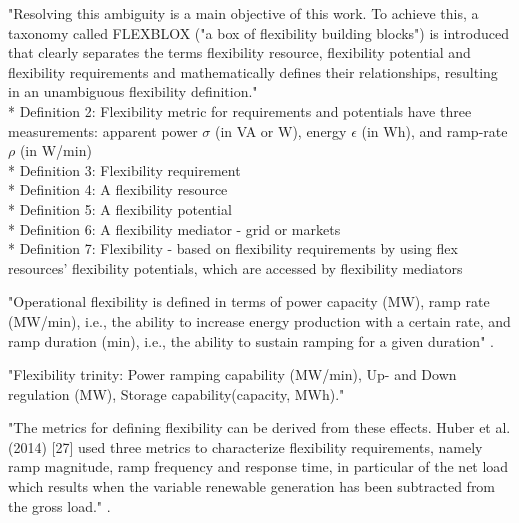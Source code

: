 "Resolving this ambiguity is a main objective of this work. To achieve this, a taxonomy called FLEXBLOX ("a box of flexibility building blocks") is introduced that clearly separates the terms flexibility resource, flexibility potential and flexibility requirements and mathematically defines their relationships, resulting in an unambiguous flexibility definition." \cite{lechl_review_2023} \\
* Definition 2: Flexibility metric for requirements and potentials have three measurements: apparent power $\sigma$ (in VA or W), energy $\epsilon$ (in Wh), and ramp-rate $\rho$ (in W/min) \\
* Definition 3: Flexibility requirement \\
* Definition 4: A flexibility resource \\
* Definition 5: A flexibility potential \\
* Definition 6: A flexibility mediator - grid or markets \\
* Definition 7: Flexibility - based on flexibility requirements by using flex resources' flexibility potentials, which are accessed by flexibility mediators \cite{lechl_review_2023} \\






"Operational flexibility is defined in terms of power capacity (MW), ramp rate (MW/min), i.e., the ability to increase energy production with a certain rate, and ramp duration (min), i.e., the ability to sustain ramping for a given duration" \cite{kaushik_comprehensive_2022}.

"Flexibility trinity: Power ramping capability (MW/min), Up- and Down regulation (MW), Storage capability(capacity, MWh)." \cite{kaushik_comprehensive_2022}

"The metrics for defining flexibility can be derived from these effects. Huber et al. (2014) [27] used three metrics to characterize flexibility requirements, namely ramp magnitude, ramp frequency and response time, in particular of the net load which results when the variable renewable generation has been subtracted from the gross load." \cite{lund_review_2015}.

